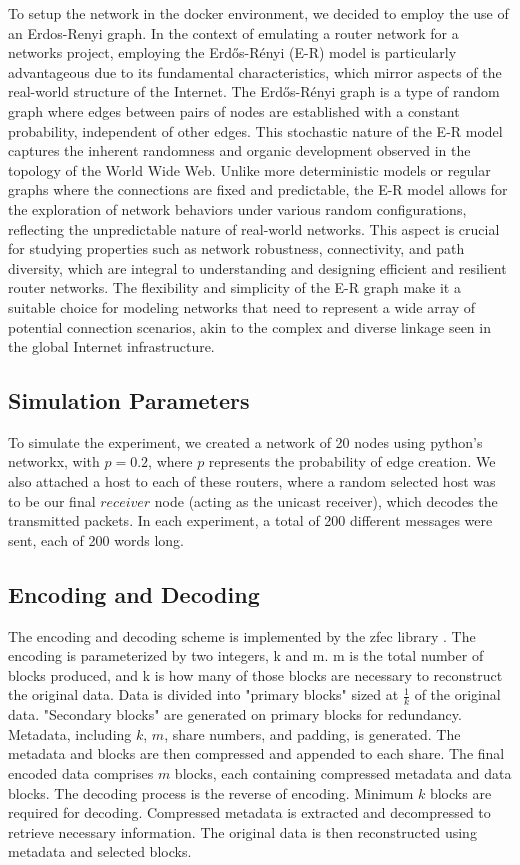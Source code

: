 To setup the network in the docker environment, we decided to employ the use of an
Erdos-Renyi graph.
In the context of emulating a router network for a networks project, employing the Erdős-Rényi (E-R) model is particularly advantageous due to its fundamental characteristics, which mirror aspects of the real-world structure of the Internet\cite{Li2021}. The Erdős-Rényi graph is a type of random graph where edges between pairs of nodes are established with a constant probability, independent of other edges. This stochastic nature of the E-R model captures the inherent randomness and organic development observed in the topology of the World Wide Web. Unlike more deterministic models or regular graphs where the connections are fixed and predictable, the E-R model allows for the exploration of network behaviors under various random configurations, reflecting the unpredictable nature of real-world networks. This aspect is crucial for studying properties such as network robustness, connectivity, and path diversity, which are integral to understanding and designing efficient and resilient router networks. The flexibility and simplicity of the E-R graph make it a suitable choice for modeling networks that need to represent a wide array of potential connection scenarios, akin to the complex and diverse linkage seen in the global Internet infrastructure.

\subsection{Simulation Parameters}

To simulate the experiment, we created a network of 20 nodes using python's networkx, with $p=0.2$, where $p$ represents the probability of edge creation. We also attached a host to each of these routers, where a random selected host was to be our
final $receiver$ node (acting as the unicast receiver), which decodes the transmitted packets. 
In each experiment, a total of 
200 different messages were sent, each of 200 words long. 



\subsection{Encoding and Decoding}
The encoding and decoding scheme is implemented by the zfec library \cite{Rizzo2013}.
The encoding is parameterized by two integers, k and m. m is the total number of blocks produced, and k is how many of those blocks are necessary to reconstruct the original data.
Data is divided into "primary blocks" sized at $\frac{1}{k}$ of the original data.
"Secondary blocks" are generated on primary blocks for redundancy.
Metadata, including $k$, $m$, share numbers, and padding, is generated. 
The metadata and blocks are then compressed and appended to each share.
The final encoded data comprises $m$ blocks, each containing compressed metadata and data blocks.
The decoding process is the reverse of encoding.
Minimum $k$ blocks are required for decoding.
Compressed metadata is extracted and decompressed to retrieve necessary information.
The original data is then reconstructed using metadata and selected blocks.




